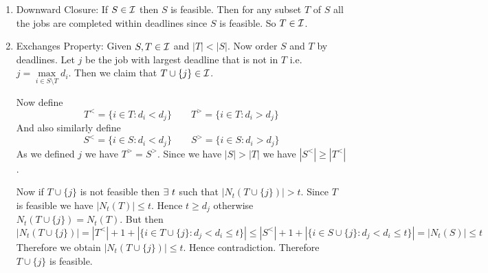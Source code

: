 \begin{alternate-proof}
	\begin{enumerate}[label=\bfseries\tiny\protect\circled{\small\arabic*}]
		\item Downward Closure: If $S\in\mathcal{I}$ then $S$ is feasible. Then for any subset $T$ of $S$ all the jobs are completed within deadlines since $S$ is feasible. So $T\in \mathcal{I}$.
		\item Exchanges Property: Given $S,T\in\mathcal{I}$ and $|T|<|S|$. Now order $S$ and $T$ by deadlines. Let $j$ be the job with largest deadline that is not in $T$ i.e. $j=\underset{i\in S\setminus T}{\max}d_i$. Then we claim that $T\cup \{j\}\in\mathcal{I}$. \parinn
		
		Now define $$T^<=\{i\in T\colon d_i<d_j\}\qquad T^>=\{i\in T\colon d_i>d_j\}$$And also similarly define$$S^<=\{i\in S\colon d_i<d_j\}\qquad S^>=\{i\in S\colon d_i>d_j\}$$As we defined $j$ we have $T^>=S^>$. Since we have $|S|>|T|$ we have $|S^<|\geq |T^<|$.  
		
		Now if $T\cup \{j\}$ is not feasible then $\exists\ t$ such that $|N_t(T\cup \{j\})|>t$. Since $T$ is feasible we have $|N_t(T)|\leq t$. Hence $t\geq d_j$ otherwise $N_t(T\cup \{j\})=N_t(T)$. But then $$|N_t(T\cup \{j\})|=|T^<|+1+|\{i\in T\cup \{j\}\colon d_j<d_i\leq t\}|\leq |S^<|+1+|\{i\in S\cup \{j\}\colon d_j<d_i\leq t\}|=|N_t(S)|\leq t$$Therefore we obtain $|N_t(T\cup \{j\})|\leq t$. Hence contradiction. Therefore $T\cup \{j\}$ is feasible.
	\end{enumerate}
\end{alternate-proof}


